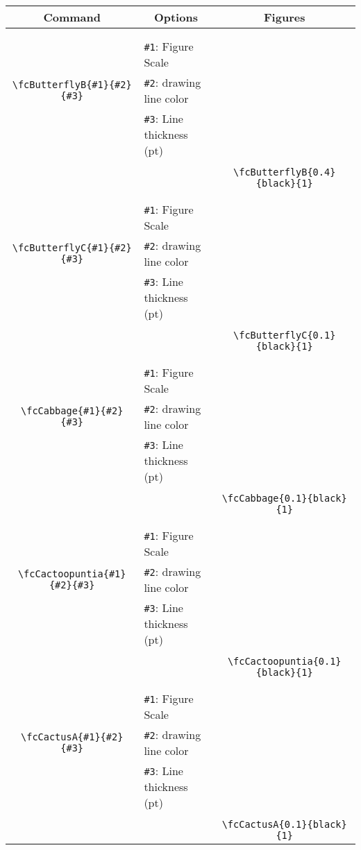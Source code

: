 \documentclass[x11names]{article}
\begin{document}
\begin{table}[H]\centering\begin{tabular}{|c|l|c|}\hline {\bf Command}& \multicolumn{1}{c|}{{\bf Options}} & {\bf Figures}\\  \hline	&&\multirow{5}{*}{\fcButterflyB{0.4}{black}{1}}\\	&&\\	&\verb|#1|: Figure Scale &\\	\verb|\fcButterflyB{#1}{#2}{#3}|&	\verb|#2|: drawing line color &\\	&\verb|#3|: Line thickness (pt) &\\ &&\\&&	\verb|\fcButterflyB{0.4}{black}{1}|\\\hline 	
	&&\multirow{5}{*}{\fcButterflyC{0.1}{black}{1}}\\	&&\\	&\verb|#1|: Figure Scale &\\	\verb|\fcButterflyC{#1}{#2}{#3}|&	\verb|#2|: drawing line color &\\	&\verb|#3|: Line thickness (pt) &\\ &&\\&&	\verb|\fcButterflyC{0.1}{black}{1}|\\\hline 	
	&&\multirow{5}{*}{\fcCabbage{0.1}{black}{1}}\\	&&\\	&\verb|#1|: Figure Scale &\\	\verb|\fcCabbage{#1}{#2}{#3}|&	\verb|#2|: drawing line color &\\	&\verb|#3|: Line thickness (pt) &\\ &&\\&&	\verb|\fcCabbage{0.1}{black}{1}|\\\hline 	
	&&\multirow{5}{*}{\fcCactoopuntia{0.1}{black}{1}}\\	&&\\	&\verb|#1|: Figure Scale &\\	\verb|\fcCactoopuntia{#1}{#2}{#3}|&	\verb|#2|: drawing line color &\\	&\verb|#3|: Line thickness (pt) &\\ &&\\&&	\verb|\fcCactoopuntia{0.1}{black}{1}|\\\hline 	
	&&\multirow{5}{*}{\fcCactusA{0.1}{black}{1}}\\	&&\\	&\verb|#1|: Figure Scale &\\	\verb|\fcCactusA{#1}{#2}{#3}|&	\verb|#2|: drawing line color &\\	&\verb|#3|: Line thickness (pt) &\\ &&\\&&	\verb|\fcCactusA{0.1}{black}{1}|\\\hline 	

\end{tabular}
\end{table}
\end{document}
